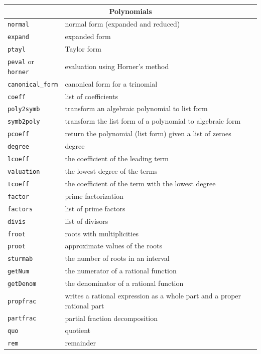 \documentclass{article}
\begin{document}
\begin{center}
\begin{tabular}{|p{}|p{}|}
\hline
\multicolumn{2}{|c|}{\bf Polynomials}\\
\hline\hline
\texttt{normal} & normal form (expanded and reduced)\\
\texttt{expand} & expanded form\\
\texttt{ptayl} & Taylor form\\
\texttt{peval} or \texttt{horner} & evaluation using Horner's method\\
\texttt{canonical\_form} & canonical form for a trinomial\\
\hline
\texttt{coeff} & list of coefficients\\
\texttt{poly2symb} & transform an algebraic polynomial to list form\\
\texttt{symb2poly} & transform the list form of a polynomial to
algebraic form\\
\texttt{pcoeff} & return the polynomial (list form) given a list of zeroes\\
\hline
\texttt{degree} & degree\\
\texttt{lcoeff} & the coefficient of the leading term\\
\texttt{valuation} & the lowest degree of the terms\\
\texttt{tcoeff} & the coefficient of the term with the lowest degree\\
\hline
\texttt{factor} & prime factorization\\
\texttt{factors} & list of prime factors\\
\texttt{divis} & list of divisors\\
\hline
\texttt{froot} & roots with multiplicities\\
\texttt{proot} & approximate values of the roots\\
\texttt{sturmab} & the number of roots in an interval\\
\hline
\texttt{getNum} & the numerator of a rational function\\
\texttt{getDenom} & the denominator of a rational function\\
\texttt{propfrac} & writes a rational expression as a whole part and a
proper rational part\\
\texttt{partfrac} & partial fraction decomposition\\
\hline
\texttt{quo} & quotient\\
\texttt{rem} & remainder\\

\end{tabular}
\end{center}
\end{document}
